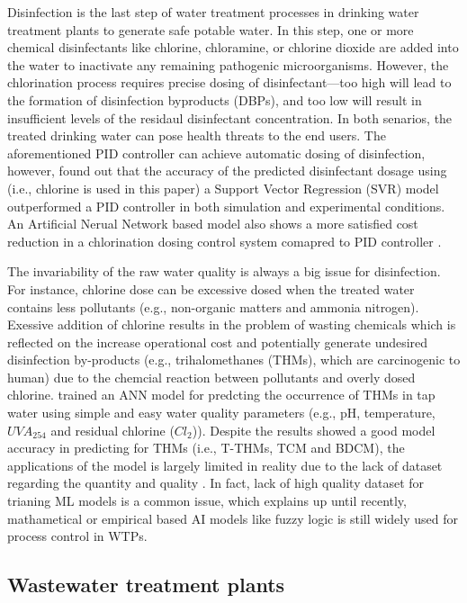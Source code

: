 Disinfection is the last step of water treatment processes in drinking water treatment plants to generate safe potable water. In this step, one or more chemical disinfectants like chlorine, chloramine, or chlorine dioxide are added into the water to inactivate any remaining pathogenic microorganisms. However, the chlorination process requires precise dosing of disinfectant---too high will lead to the formation of disinfection byproducts (DBPs), and too low will result in insufficient levels of the residaul disinfectant concentration. In both senarios, the treated drinking water can pose health threats to the end users. The aforementioned PID controller can achieve automatic dosing of disinfection, however, \citet{wangModelPredictiveControl2020} found out that the accuracy of the predicted disinfectant dosage using (i.e., chlorine is used in this paper) a Support Vector Regression (SVR) model outperformed a PID controller in both simulation and experimental conditions. An Artificial Nerual Network based model also shows a more satisfied cost reduction in a chlorination dosing control system comapred to PID controller \citep{librantzArtificialNeuralNetworks2018}.

The invariability of the raw water quality is always a big issue for disinfection. For instance, chlorine dose can be excessive dosed when the treated water contains less pollutants (e.g., non-organic matters and ammonia nitrogen). Exessive addition of chlorine results in the problem of wasting chemicals which is reflected on the increase operational cost and potentially generate undesired disinfection by-products (e.g., trihalomethanes (THMs), which are carcinogenic to human) due to the chemcial reaction between pollutants and overly dosed chlorine. \citet{xuUsingSimpleEasy2022} trained an ANN model for predcting the occurrence of THMs in tap water using simple and easy water quality parameters (e.g., pH, temperature, $UVA_{254}$ and residual chlorine ($Cl_{2}$)). Despite the results showed a good model accuracy in predicting for THMs (i.e., T-THMs, TCM and BDCM), the applications of the model is largely limited in reality due to the lack of dataset regarding the quantity and quality . In fact, lack of high quality dataset for trianing ML models is a common issue, which explains up until recently, mathametical or empirical based AI models like fuzzy logic \citep{gamizFuzzyGainScheduling2020,godo-plaControlPrimaryDisinfection2021} is still widely used for process control in WTPs.

\subsection{Wastewater treatment plants}



